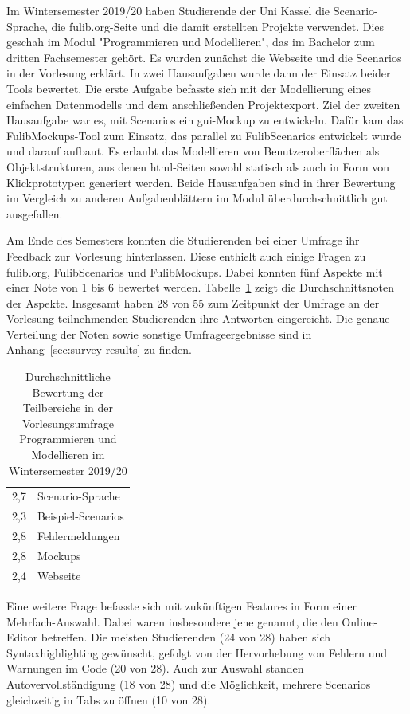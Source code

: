 Im Wintersemester 2019/20 haben Studierende der Uni Kassel die Scenario-Sprache, die fulib.org-Seite und die damit erstellten Projekte verwendet.
Dies geschah im Modul "Programmieren und Modellieren", das im Bachelor zum dritten Fachsemester gehört.
Es wurden zunächst die Webseite und die Scenarios in der Vorlesung erklärt.
In zwei Hausaufgaben wurde dann der Einsatz beider Tools bewertet.
Die erste Aufgabe befasste sich mit der Modellierung eines einfachen Datenmodells und dem anschließenden Projektexport.
Ziel der zweiten Hausaufgabe war es, mit Scenarios ein \ac{gui}-Mockup zu entwickeln.
Dafür kam das FulibMockups-Tool zum Einsatz, das parallel zu FulibScenarios entwickelt wurde und darauf aufbaut.
Es erlaubt das Modellieren von Benutzeroberflächen als Objektstrukturen, aus denen \ac{html}-Seiten sowohl statisch als auch in Form von Klickprototypen generiert werden.
Beide Hausaufgaben sind in ihrer Bewertung im Vergleich zu anderen Aufgabenblättern im Modul überdurchschnittlich gut ausgefallen.

Am Ende des Semesters konnten die Studierenden bei einer Umfrage ihr Feedback zur Vorlesung hinterlassen.
Diese enthielt auch einige Fragen zu fulib.org, FulibScenarios und FulibMockups.
Dabei konnten fünf Aspekte mit einer Note von 1 bis 6 bewertet werden.
Tabelle~\ref{tab:survey-results} zeigt die Durchschnittsnoten der Aspekte.
Insgesamt haben 28 von 55 zum Zeitpunkt der Umfrage an der Vorlesung teilnehmenden Studierenden ihre Antworten eingereicht.
Die genaue Verteilung der Noten sowie sonstige Umfrageergebnisse sind in Anhang~\ref{sec:survey-results} zu finden.

\begin{table}
    \caption{Durchschnittliche Bewertung der Teilbereiche in der Vorlesungsumfrage Programmieren und Modellieren im Wintersemester 2019/20}
    \label{tab:survey-results}
    \centering
    \begin{tabular}{rl}
        \toprule
        2,7 & Scenario-Sprache \\
        2,3 & Beispiel-Scenarios \\
        2,8 & Fehlermeldungen \\
        2,8 & Mockups \\
        2,4 & Webseite \\
        \bottomrule
    \end{tabular}
\end{table}

Eine weitere Frage befasste sich mit zukünftigen Features in Form einer Mehrfach-Auswahl.
Dabei waren insbesondere jene genannt, die den Online-Editor betreffen.
Die meisten Studierenden (24 von 28) haben sich Syntaxhighlighting gewünscht, gefolgt von der Hervorhebung von Fehlern und Warnungen im Code (20 von 28).
Auch zur Auswahl standen Autovervollständigung (18 von 28) und die Möglichkeit, mehrere Scenarios gleichzeitig in Tabs zu öffnen (10 von 28).

